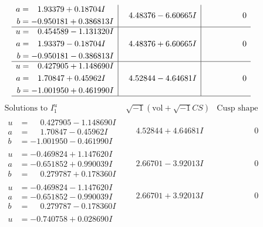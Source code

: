\documentclass[1p]{elsarticle_modified}
\theoremstyle{definition}
\newcommand{\I}{\sqrt{-1}}
\begin{document}
$$\begin{array}{c|c|c}
\begin{aligned}
a &= \phantom{-}1.93379 + 0.18704 I \\
b &= -0.950181 + 0.386813 I\end{aligned}
 & \phantom{-}4.48376 - 6.60665 I & \phantom{-0.000000 } 0 \\ \hline\begin{aligned}
u &= \phantom{-}0.454589 - 1.131320 I \\
a &= \phantom{-}1.93379 - 0.18704 I \\
b &= -0.950181 - 0.386813 I\end{aligned}
 & \phantom{-}4.48376 + 6.60665 I & \phantom{-0.000000 } 0 \\ \hline\begin{aligned}
u &= \phantom{-}0.427905 + 1.148690 I \\
a &= \phantom{-}1.70847 + 0.45962 I \\
b &= -1.001950 + 0.461990 I\end{aligned}
 & \phantom{-}4.52844 - 4.64681 I & \phantom{-0.000000 } 0\\
 \hline 
 \end{array}$$\newpage$$\begin{array}{c|c|c}  
\text{Solutions to }I^u_{1}& \I (\text{vol} + \sqrt{-1}CS) & \text{Cusp shape}\\
 \hline 
\begin{aligned}
u &= \phantom{-}0.427905 - 1.148690 I \\
a &= \phantom{-}1.70847 - 0.45962 I \\
b &= -1.001950 - 0.461990 I\end{aligned}
 & \phantom{-}4.52844 + 4.64681 I & \phantom{-0.000000 } 0 \\ \hline\begin{aligned}
u &= -0.469824 + 1.147620 I \\
a &= -0.651852 + 0.990039 I \\
b &= \phantom{-}0.279787 + 0.178360 I\end{aligned}
 & \phantom{-}2.66701 - 3.92013 I & \phantom{-0.000000 } 0 \\ \hline\begin{aligned}
u &= -0.469824 - 1.147620 I \\
a &= -0.651852 - 0.990039 I \\
b &= \phantom{-}0.279787 - 0.178360 I\end{aligned}
 & \phantom{-}2.66701 + 3.92013 I & \phantom{-0.000000 } 0 \\ \hline\begin{aligned}
u &= -0.740758 + 0.028690 I \\

\end{aligned}
\end{array}$$
\end{document}
